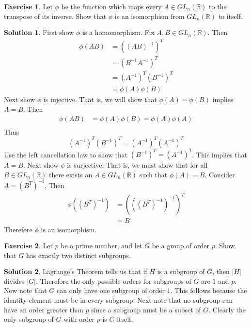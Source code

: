 \documentclass[12pt]{article}
\theoremstyle{definition}
\newtheorem{exercise}{\color{YellowOrange}Exercise}
\theoremstyle{definition}
\newtheorem{solution}{\color{Goldenrod}Solution}
\begin{document}
\begin{exercise}
Let $\phi$ be the function which maps every $A \in GL_n(\mathbb{R})$ to the transpose of its inverse. Show that $\phi$ is an isomorphism from $GL_n(\mathbb{R})$ to itself.
\end{exercise}
\begin{solution}
First show $\phi$ is a homomorphism. Fix $A, B \in GL_n(\mathbb{R})$. Then
\begin{align*}
\phi(AB) &= ((AB)^{-1})^T \\
&= (B^{-1}A^{-1})^T \\
&= (A^{-1})^T (B^{-1})^T \\
&= \phi(A)\phi(B)
\end{align*}
Next show $\phi$ is injective. That is, we will show that $\phi(A) = \phi(B)$ implies $A = B$. Then
\begin{align*}
\phi(AB) &= \phi(A) \phi(B) = \phi(A) \phi(A) \\
\end{align*}
Thus
\begin{equation}
(A^{-1})^T (B^{-1})^T = (A^{-1})^T (A^{-1})^T 
\end{equation}
Use the left cancellation law to show that $(B^{-1})^T = (A^{-1})^T$. This implies that $A = B$. Next show $\phi$ is surjective. That is, we must show that for all $B \in GL_n(\mathbb{R})$ there exists an $A \in GL_n(\mathbb{R})$ such that $\phi(A) = B$. Consider $A = (B^T)^{-1}$. Then
\begin{align}
\phi((B^T)^{-1}) &= (((B^T)^{-1})^{-1})^T \\
&= B
\end{align}
Therefore $\phi$ is an isomorphism.
\end{solution}

\begin{exercise}
Let $p$ be a prime number, and let $G$ be a group of order $p$. Show that $G$ has exactly two distinct subgroups. 
\end{exercise}
\begin{solution}
Lagrange's Theorem tells us that if $H$ is a subgroup of $G$, then $|H|$ divides $|G|$. Therefore the only possible orders for subgroups of $G$ are $1$ and $p$. Now note that $G$ can only have one subgroup of order $1$. This follows because the identity element must be in every subgroup. Next note that no subgroup can have an order greater than $p$ since a subgroup must be a subset of $G$. Clearly the only subgroup of $G$ with order $p$ is $G$ itself.  
\end{solution}
\end{document}
